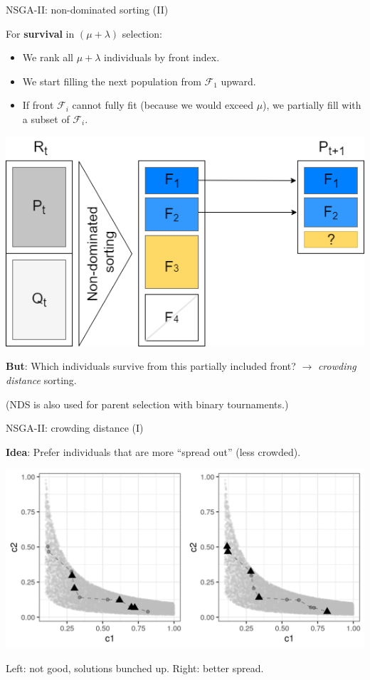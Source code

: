 \documentclass[11pt,compress,t,notes=noshow,xcolor=table]{beamer}
\begin{document}
\begin{vbframe}{NSGA-II: non-dominated sorting (II)}

For \textbf{survival} in $(\mu + \lambda)$ selection:
\begin{itemize}
\item We rank all $\mu + \lambda$ individuals by front index.
\item We start filling the next population from $\mathcal{F}_1$ upward.
\item If front $\mathcal{F}_i$ cannot fully fit (because we would exceed $\mu$), we partially fill with a subset of $\mathcal{F}_i$.
\end{itemize}

\begin{center}
\includegraphics[width=0.45\linewidth]{slides/11-multicrit/figure_man/NSGA2_2.png}
\end{center}

\textbf{But}: Which individuals survive from this partially included front?  
$\to$ \emph{crowding distance} sorting.

\smallskip
\footnotesize
(NDS is also used for parent selection with binary tournaments.)
\normalsize

\end{vbframe}

\begin{vbframe}{NSGA-II: crowding distance (I)}

\textbf{Idea}: Prefer individuals that are more “spread out” (less crowded).

\begin{center}
\includegraphics[height=0.55\textheight]{slides/11-multicrit/figure_man/NSGA2_CS1.png}
\end{center}

Left: not good, solutions bunched up.  
Right: better spread.

\end{vbframe}
\end{document}
